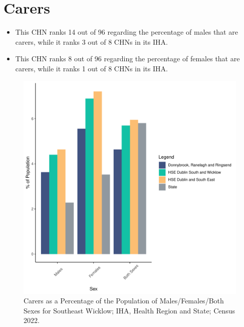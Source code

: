 \documentclass{article}
\begin{document}
\section{Carers}\label{sect:Carers}
\begin{itemize}
\item This CHN ranks  14 out of 96 regarding the percentage of males that are carers, while it ranks   3 out of 8 CHNs in its IHA.
\item This CHN ranks  8 out of 96 regarding the percentage of females that are carers, while it ranks   1 out of 8 CHNs in its IHA.
\end{itemize}
\begin{figure}[H]
	\centering
	\includegraphics[width = 150mm]{../figures/CareED.pdf}
	\caption{Carers as a Percentage of the Population of Males/Females/Both Sexes for Southeast Wicklow; IHA, Health Region and State; Census 2022.}
	\label{fig:2ae19629-1a6a-13a3-e055-000000000001}
	\end{figure}
\end{document}
